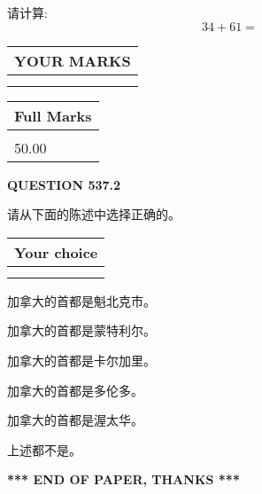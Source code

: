 \documentclass{ctexart}
\begin{document}
  
 
请计算:
\begin{equation}
34 +  %
61 = \nonumber
\end{equation}
 

 

 
  
\vspace{0.2in}
  
\noindent\begin{tabular}{|l|}
\hline
 YOUR MARKS  \\
\hline
 \\ 
 \\ 
\hline
\end{tabular}
\hspace{0.05in} \begin{tabular}{|l|}
\hline
 Full Marks  \\
\hline
 \\ 
50.00 \\
\hline
\end{tabular}
{\textbf{\Large{QUESTION
537.2 
}}}
  
  
请从下面的陈述中选择正确的。
  
  
\noindent\hspace{3.0in} \begin{tabular}{|l|}
\hline
Your choice \\
\hline
 \\ 
 \\ 
\hline
\end{tabular}
  
  
 
 
加拿大的首都是魁北克市。
 
 
加拿大的首都是蒙特利尔。
 
 
加拿大的首都是卡尔加里。
 
 
加拿大的首都是多伦多。
 
 
加拿大的首都是渥太华。
 
 
 上述都不是。
 
 
   
   
 \vspace{0.2in}
 
   
   
   
   
\vspace{1.0in} 
{\textbf{\large{ *** END OF PAPER, THANKS *** }}} 
   
\end{document}

